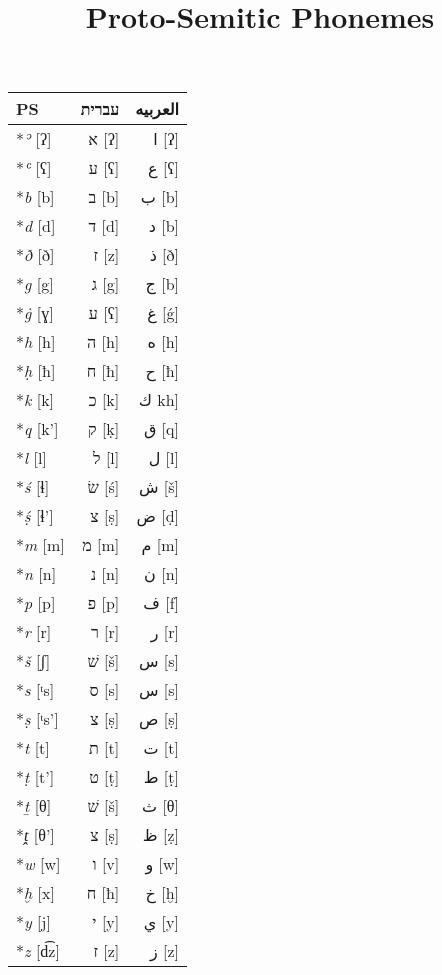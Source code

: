 \documentclass[border=0.25in]{standalone}
\begin{document}
\title{Proto-Semitic Phonemes}
\begin{tabular}{@{}lrr@{}}
  \toprule
  PS              & \texthebrew{עברית} & \textarabic{العربيه} \\
  \midrule
  \**\textit{ʾ} [ʔ]   & \texthebrew{א} [ʔ] & \textarabic{ا} [ʔ] \\
  \**\textit{ʿ} [ʕ]   & \texthebrew{ע} [ʕ] & \textarabic{ع} [ʕ] \\
  \**\textit{b} [b]   & \texthebrew{ב} [b] & \textarabic{ب} [b] \\
  \**\textit{d} [d]   & \texthebrew{ד} [d] & \textarabic{د} [b] \\
  \**\textit{ð} [ð]   & \texthebrew{ז} [z] & \textarabic{ذ} [ð] \\
  \**\textit{g} [g]   & \texthebrew{ג} [g] & \textarabic{ج} [b] \\
  \**\textit{ġ} [ɣ]   & \texthebrew{ע} [ʕ] & \textarabic{غ} [\'{g}] \\
  \**\textit{h} [h]   & \texthebrew{ה} [h] & \textarabic{ه} [h] \\ 
  \**\textit{ḥ} [ħ]   & \texthebrew{ח} [ħ] & \textarabic{ح} [ħ] \\
  \**\textit{k} [k]   & \texthebrew{כ} [k] & \textarabic{ك} kh] \\
  \**\textit{q} [k']  & \texthebrew{ק} [ḳ] & \textarabic{ق} [q]\\
  \**\textit{l} [l]   & \texthebrew{ל} [l] & \textarabic{ل} [l]\\
  \**\textit{ś} [ɬ]   & \texthebrew{שׂ} [ś] & \textarabic{ش} [š]\\
  \**\textit{ṣ́} [ɬ']  & \texthebrew{צ} [ṣ] & \textarabic{ض} [ḍ]\\
  \**\textit{m} [m]   & \texthebrew{מ} [m] & \textarabic{م} [m]\\
  \**\textit{n} [n]   & \texthebrew{נ} [n] & \textarabic{ن} [n]\\
  \**\textit{p} [p]   & \texthebrew{פ} [p] & \textarabic{ف} [f]\\
  \**\textit{r} [r]   & \texthebrew{ר} [r] & \textarabic{ر} [r]\\
  \**\textit{š} [ʃ]   & \texthebrew{שׁ} [š] & \textarabic{س} [s]\\
  \**\textit{s} [ᵗs]  & \texthebrew{ס} [s] & \textarabic{س} [s]\\
  \**\textit{ṣ} [ᵗs'] & \texthebrew{צ} [ṣ] & \textarabic{ص} [ṣ]\\
  \**\textit{t} [t]   & \texthebrew{ת} [t] & \textarabic{ت} [t]\\
  \**\textit{ṭ} [t']  & \texthebrew{ט} [ṭ] & \textarabic{ط} [ṭ]\\
  \**\textit{ṯ} [θ]   & \texthebrew{שׁ} [š] & \textarabic{ث} [θ]\\
  \**\textit{ṱ} [θ']  & \texthebrew{צ} [ṣ] & \textarabic{ظ} [ẓ]\\
  \**\textit{w} [w]   & \texthebrew{ו} [v] & \textarabic{و} [w]\\
  \**\textit{ḫ} [x]   & \texthebrew{ח} [ħ] & \textarabic{خ} [ḫ]\\
  \**\textit{y} [j]   & \texthebrew{י} [y] & \textarabic{ي} [y]\\
  \**\textit{z} [d͡z]  & \texthebrew{ז} [z] & \textarabic{ز} [z]\\
  \bottomrule
\end{tabular}
\end{document}
